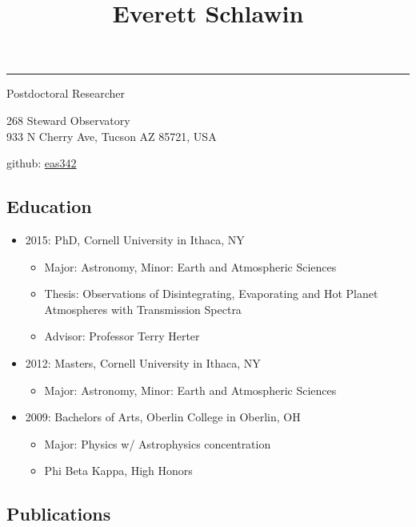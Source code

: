 \documentclass[11pt, oneside]{article}   	%
\title{Everett Schlawin}
\date{}							%
\begin{document}
\maketitle
\vspace{-0.85in}
\begin{centering}
\rule{6in}{0.03in}
Postdoctoral Researcher

268 Steward Observatory\\
933 N Cherry Ave, Tucson AZ 85721, USA

github: \href{https://github.com/eas342}{eas342}

\end{centering}

\subsection*{Education}
\begin{itemize}[noitemsep]
	\item 2015: PhD, Cornell University in Ithaca, NY
		\begin{itemize}[noitemsep]
		\item Major: Astronomy, Minor: Earth and Atmospheric Sciences
		\item Thesis: Observations of Disintegrating, Evaporating and Hot Planet Atmospheres with Transmission Spectra
		\item Advisor: Professor Terry Herter
		\end{itemize}
	\item 2012: Masters, Cornell University in Ithaca, NY
		\begin{itemize}[noitemsep]
		\item Major: Astronomy, Minor: Earth and Atmospheric Sciences
		\end{itemize}
	\item 2009: Bachelors of Arts, Oberlin College in Oberlin, OH
		\begin{itemize}[noitemsep]
		\item Major: Physics w/ Astrophysics concentration
		\item Phi Beta Kappa, High Honors
		\end{itemize}
\end{itemize}

\vspace{-0.2in}
\subsection*{Publications}
\nocite{schlawin2014}
\nocite{schlawin2017dhs}
\nocite{schlawin2017bdVar}
\nocite{greene2017jatisNIRCam}
\nocite{greene2016slitlessGrisms}
\nocite{schlawin2016kic1255}
\nocite{schlawin2010}
\nocite{schlawin2016kic1255}
\nocite{schlawin2014TSpec}
\nocite{muirheadKOI961}
\nocite{dale2009spitzerAnthology}
\nocite{west2011sloanMdwarf}
\nocite{muirhead2012}
\nocite{johnson2012}
\nocite{muirheadKOI961}
\nocite{muirhead2014coolKOIIV}
\end{document}
